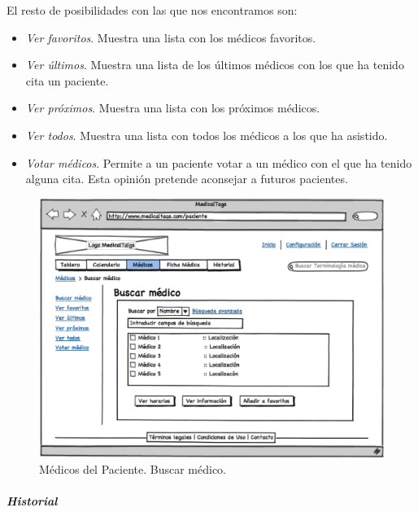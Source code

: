 \documentclass[a4paper,oneside,11pt]{book}
\begin{document}
			
			El resto de posibilidades con las que nos encontramos son:
			\begin{itemize}
				\item \textit{Ver favoritos}. Muestra una lista con los médicos favoritos.
				\item \textit{Ver últimos}. Muestra una lista de los últimos médicos con los que ha tenido cita un paciente.
				\item \textit{Ver próximos}. Muestra una lista con los próximos médicos.
				\item \textit{Ver todos}. Muestra una lista con todos los médicos a los que ha asistido.
				\item \textit{Votar médicos}. Permite a un paciente votar a un médico con el que ha tenido alguna cita. Esta opinión pretende aconsejar a futuros pacientes.
			\end{itemize}
		
		
			\begin{figure}[H]
			  \centering
			    \includegraphics[width=12cm]{img/eps/28_Medicos_Paciente.eps}
			  \caption{Médicos del Paciente. Buscar médico.}
			  \label{fig:medico_paciente_buscar}
			\end{figure}
		
		
		\subparagraph{Historial} %
		\label{par:paciente_historial}
		
\end{document}
